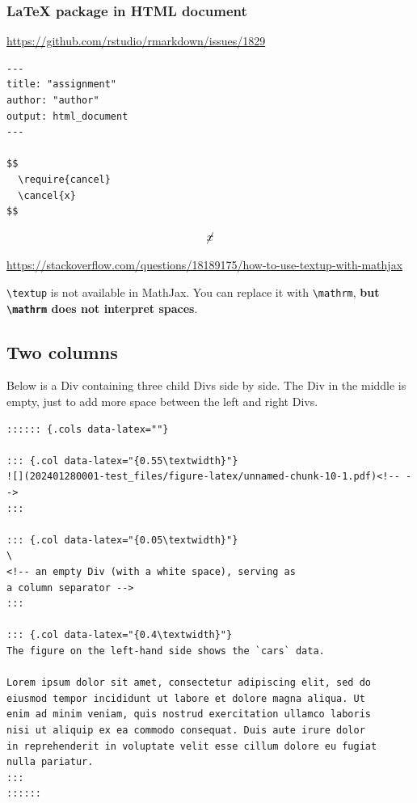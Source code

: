 \documentclass[
]{book}
\theoremstyle{definition}
\theoremstyle{definition}
\theoremstyle{definition}
\theoremstyle{definition}
\theoremstyle{remark}
\begin{document}
\hypertarget{latex-package-in-html-document}{%
\subsubsection{LaTeX package in HTML document}\label{latex-package-in-html-document}}

\url{https://github.com/rstudio/rmarkdown/issues/1829}

\begin{verbatim}
---
title: "assignment"
author: "author"
output: html_document
---

$$
  \require{cancel}
  \cancel{x}
$$
\end{verbatim}

\[
  \cancel{x}
\]

\url{https://stackoverflow.com/questions/18189175/how-to-use-textup-with-mathjax}

\texttt{\textbackslash{}textup} is not available in MathJax. You can replace it with \texttt{\textbackslash{}mathrm}, \textbf{but \texttt{\textbackslash{}mathrm} does not interpret spaces}.

\hypertarget{two-columns}{%
\subsection{Two columns}\label{two-columns}}

Below is a Div containing three child Divs side by side. The Div
in the middle is empty, just to add more space between the left
and right Divs.

\begin{verbatim}
:::::: {.cols data-latex=""}

::: {.col data-latex="{0.55\textwidth}"}
![](202401280001-test_files/figure-latex/unnamed-chunk-10-1.pdf)<!-- --> 
:::

::: {.col data-latex="{0.05\textwidth}"}
\ 
<!-- an empty Div (with a white space), serving as
a column separator -->
:::

::: {.col data-latex="{0.4\textwidth}"}
The figure on the left-hand side shows the `cars` data.

Lorem ipsum dolor sit amet, consectetur adipiscing elit, sed do
eiusmod tempor incididunt ut labore et dolore magna aliqua. Ut
enim ad minim veniam, quis nostrud exercitation ullamco laboris
nisi ut aliquip ex ea commodo consequat. Duis aute irure dolor
in reprehenderit in voluptate velit esse cillum dolore eu fugiat
nulla pariatur.
:::
::::::
\end{verbatim}
\end{document}

